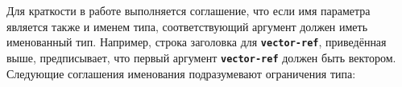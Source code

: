 Для краткости в работе выполняется соглашение, что если имя параметра является также и
именем типа, соответствующий аргумент должен иметь именованный тип. Например, строка
заголовка для {\bfseries\tt vector-ref}, приведённая выше, предписывает, что первый аргумент
{\bfseries\tt vector-ref} должен быть вектором. Следующие соглашения именования
подразумевают ограничения типа:\vspace{1mm}

